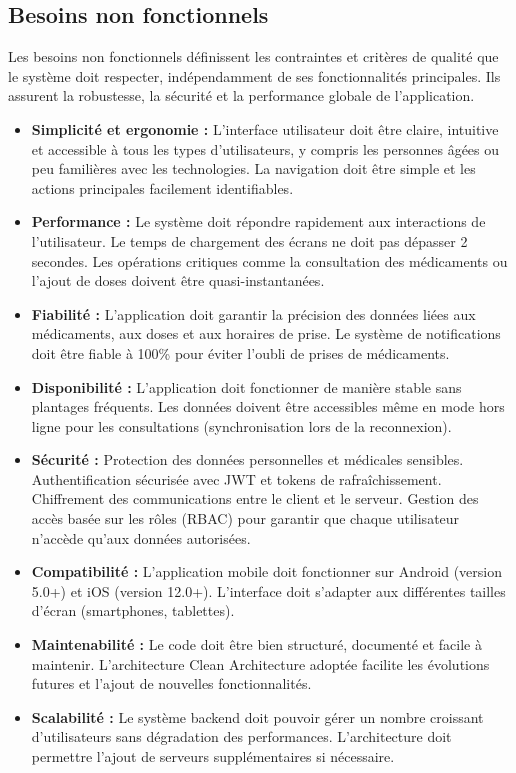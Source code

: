 \subsection{Besoins non fonctionnels}
Les besoins non fonctionnels définissent les contraintes et critères de qualité que le système doit respecter, indépendamment de ses fonctionnalités principales. Ils assurent la robustesse, la sécurité et la performance globale de l'application.

\begin{itemize}
    \item \textbf{Simplicité et ergonomie :} L'interface utilisateur doit être claire, intuitive et accessible à tous les types d'utilisateurs, y compris les personnes âgées ou peu familières avec les technologies. La navigation doit être simple et les actions principales facilement identifiables.

    \item \textbf{Performance :} Le système doit répondre rapidement aux interactions de l'utilisateur. Le temps de chargement des écrans ne doit pas dépasser 2 secondes. Les opérations critiques comme la consultation des médicaments ou l'ajout de doses doivent être quasi-instantanées.

    \item \textbf{Fiabilité :} L'application doit garantir la précision des données liées aux médicaments, aux doses et aux horaires de prise. Le système de notifications doit être fiable à 100\% pour éviter l'oubli de prises de médicaments.

    \item \textbf{Disponibilité :} L'application doit fonctionner de manière stable sans plantages fréquents. Les données doivent être accessibles même en mode hors ligne pour les consultations (synchronisation lors de la reconnexion).

    \item \textbf{Sécurité :} Protection des données personnelles et médicales sensibles. Authentification sécurisée avec JWT et tokens de rafraîchissement. Chiffrement des communications entre le client et le serveur. Gestion des accès basée sur les rôles (RBAC) pour garantir que chaque utilisateur n'accède qu'aux données autorisées.

    \item \textbf{Compatibilité :} L'application mobile doit fonctionner sur Android (version 5.0+) et iOS (version 12.0+). L'interface doit s'adapter aux différentes tailles d'écran (smartphones, tablettes).

    \item \textbf{Maintenabilité :} Le code doit être bien structuré, documenté et facile à maintenir. L'architecture Clean Architecture adoptée facilite les évolutions futures et l'ajout de nouvelles fonctionnalités.

    \item \textbf{Scalabilité :} Le système backend doit pouvoir gérer un nombre croissant d'utilisateurs sans dégradation des performances. L'architecture doit permettre l'ajout de serveurs supplémentaires si nécessaire.
\end{itemize}

